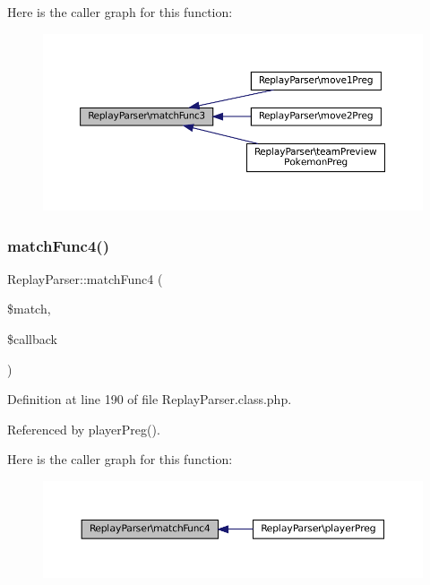 Here is the caller graph for this function\+:\nopagebreak
\begin{figure}[H]
\begin{center}
\leavevmode
\includegraphics[width=350pt]{class_replay_parser_acd7c392f18f3b3ad335de013cce3933a_icgraph}
\end{center}
\end{figure}
\mbox{\label{class_replay_parser_ab801646e64e6b8ecac29ce7ee1747d25}} 
\subsubsection{\texorpdfstring{match\+Func4()}{matchFunc4()}}
{\footnotesize\ttfamily Replay\+Parser\+::match\+Func4 (\begin{DoxyParamCaption}\item[{}]{\$match,  }\item[{}]{\$callback }\end{DoxyParamCaption})}



Definition at line 190 of file Replay\+Parser.\+class.\+php.



Referenced by player\+Preg().

Here is the caller graph for this function\+:\nopagebreak
\begin{figure}[H]
\begin{center}
\leavevmode
\includegraphics[width=350pt]{class_replay_parser_ab801646e64e6b8ecac29ce7ee1747d25_icgraph}
\end{center}
\end{figure}
\mbox{\label{class_replay_parser_a7bf96da9470293c55f2b660b06567c9c}} 
